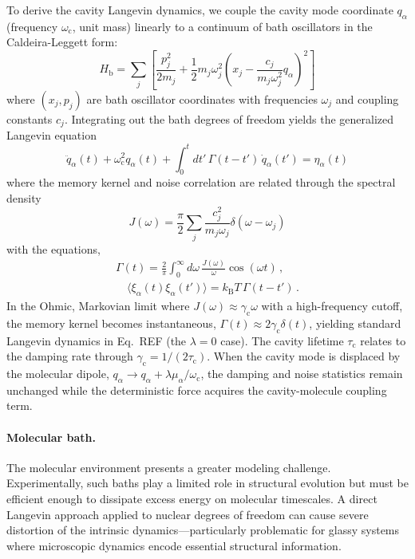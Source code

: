 \documentclass[%
 reprint,
 amsmath,amssymb,
 aps,
]{revtex4-2}
\begin{document}
To derive the cavity Langevin dynamics, we couple the cavity mode coordinate $q_\alpha$ (frequency $\omega_\mathrm{c}$, unit mass) linearly to a continuum of bath oscillators in the Caldeira-Leggett form:
\begin{equation}
H_\mathrm{b} = \sum_j \left[\frac{p_j^2}{2m_j} + \frac{1}{2}m_j \omega_j^2 \left(x_j - \frac{c_j}{m_j \omega_j^2} q_\alpha\right)^2 \right]
\end{equation}
where $(x_j, p_j)$ are bath oscillator coordinates with frequencies $\omega_j$ and coupling constants $c_j$. Integrating out the bath degrees of freedom yields the generalized Langevin equation
\begin{equation}
\ddot{q}_\alpha(t) + \omega_\mathrm{c}^2 q_\alpha(t) + \int_0^t \!\! dt' \, \Gamma(t-t') \, \dot{q}_\alpha(t') = \eta_\alpha(t)
\end{equation}
where the memory kernel and noise correlation are related through the spectral density
\begin{equation}
J(\omega) = \frac{\pi}{2} \sum_j \frac{c_j^2}{m_j \omega_j} \delta(\omega - \omega_j)
\end{equation}
with the equations,
\begin{gather}
\Gamma(t) = \frac{2}{\pi} \int_0^\infty \!\! d\omega \, \frac{J(\omega)}{\omega} \cos(\omega t) \,, 
\\
\quad
\langle \xi_\alpha(t) \xi_\alpha(t') \rangle = k_\mathrm{B} T \, \Gamma(t-t') \,.
\end{gather}
In the Ohmic, Markovian limit where $J(\omega) \approx \gamma_\mathrm{c} \omega$ with a high-frequency cutoff, the memory kernel becomes instantaneous, $\Gamma(t) \approx 2\gamma_\mathrm{c} \delta(t)$, yielding standard Langevin dynamics in Eq.~REF (the $\lambda=0$ case).
The cavity lifetime $\tau_\mathrm{c}$ relates to the damping rate through $\gamma_\mathrm{c} = 1/(2\tau_\mathrm{c})$.
When the cavity mode is displaced by the molecular dipole, $q_\alpha \to q_\alpha + \lambda \mu_\alpha / \omega_\mathrm{c}$, the damping and noise statistics remain unchanged while the deterministic force acquires the cavity-molecule coupling term.

\paragraph{Molecular bath.}
The molecular environment presents a greater modeling challenge.
Experimentally, such baths play a limited role in structural evolution but must be efficient enough to dissipate excess energy on molecular timescales.
A direct Langevin approach applied to nuclear degrees of freedom can cause severe distortion of the intrinsic dynamics---particularly problematic for glassy systems where microscopic dynamics encode essential structural information.
\end{document}
